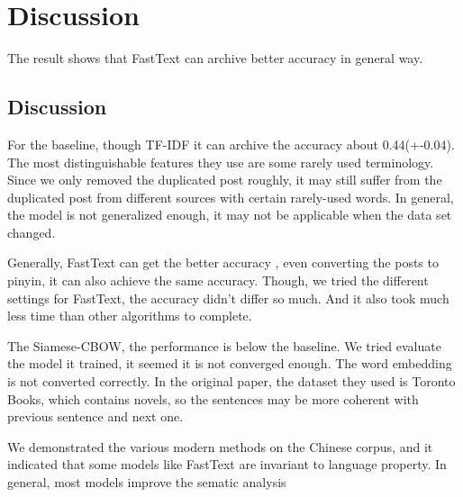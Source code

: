 \chapter{Discussion}

The result shows that FastText can archive better accuracy in general way.

\section{Discussion}


For the baseline, though TF-IDF it can archive the accuracy about 0.44(+-0.04). The most distinguishable features they use are some rarely used terminology. Since we only removed the duplicated post roughly, it may still suffer from the duplicated post from different sources with certain rarely-used words. In general, the model is not generalized enough, it may not be applicable when the data set changed.

Generally, FastText can get the better accuracy , even converting the posts to pinyin, it can also achieve the same accuracy. Though, we tried the different settings for FastText, the accuracy didn't differ so much. And it also took much less time than other algorithms to complete.

The Siamese-CBOW, the performance is below the baseline. We tried evaluate the model it trained, it seemed it is not converged enough. The word embedding is not converted correctly. In the original paper, the dataset they used is Toronto Books, which contains novels, so the sentences may be more coherent with previous sentence and next one. 

We demonstrated the various modern methods on the Chinese corpus, and it indicated that some models like FastText are invariant to language property. In general, most models improve the sematic analysis 